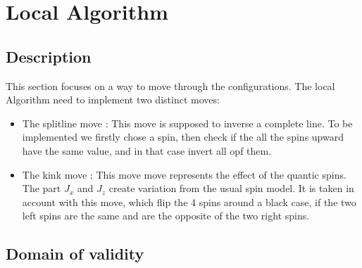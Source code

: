 \documentclass[a4paper,12pt,twoside]{article}
\begin{document}
	\newpage
	\section{Local Algorithm}
	\subsection{Description}

		
	 This section focuses on a way to move through the configurations.
	 The local Algorithm need to implement two distinct moves:
	 
	 \begin{itemize}[label=$\star$]
	 	\item{The splitline move :} This move is supposed to inverse a complete line. To be implemented we firstly chose a spin, then check if the all the spins upward have the same value, and in that case invert all opf them.
	 	
	 	\item{The kink move :} This move move represents the effect of the quantic spins. The part $J_x$ and $J_z$ create variation from the usual spin model. It is taken in account with this move, which flip the 4 spins around a black case, if the two left spins are the same and are the opposite of the two right spins.
	 \end{itemize}
		 	
		 	
		 	
 	\subsection{Domain of validity}
\end{document}
